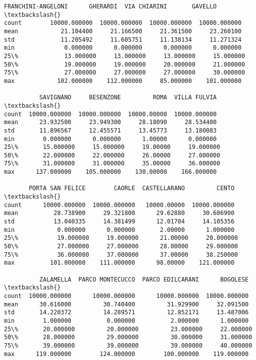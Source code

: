 \documentclass[11pt]{article}
\begin{document}
\begin{tcolorbox}[breakable, size=fbox, boxrule=.5pt, pad at break*=1mm, opacityfill=0]
\begin{Verbatim}[commandchars=\\\{\}]
       FRANCHINI-ANGELONI      GHERARDI  VIA CHIARINI       GAVELLO  \textbackslash{}
count        10000.000000  10000.000000  10000.000000  10000.000000
mean            21.104400     21.166500     21.361500     23.260100
std             11.205492     11.605751     11.138134     11.271324
min              0.000000      0.000000      0.000000      0.000000
25\%             13.000000     13.000000     13.000000     15.000000
50\%             19.000000     19.000000     20.000000     21.000000
75\%             27.000000     27.000000     27.000000     30.000000
max            102.000000    112.000000     85.000000    101.000000

          SAVIGNANO     BESENZONE         ROMA  VILLA FULVIA  \textbackslash{}
count  10000.000000  10000.000000  10000.00000  10000.000000
mean      23.932500     23.949300     28.18090     28.534400
std       11.896567     12.455571     13.45773     13.180083
min        0.000000      0.000000      1.00000      0.000000
25\%       15.000000     15.000000     19.00000     19.000000
50\%       22.000000     22.000000     26.00000     27.000000
75\%       31.000000     31.000000     35.00000     36.000000
max      137.000000    105.000000    130.00000    166.000000

       PORTA SAN FELICE        CAORLE  CASTELLARANO         CENTO  \textbackslash{}
count      10000.000000  10000.000000   10000.00000  10000.000000
mean          28.738900     29.321800      29.62880     30.606900
std           13.040335     14.381499      12.01704     14.105356
min            0.000000      0.000000       2.00000      1.000000
25\%           19.000000     19.000000      21.00000     20.000000
50\%           27.000000     27.000000      28.00000     29.000000
75\%           36.000000     37.000000      37.00000     38.250000
max          101.000000    111.000000      98.00000    121.000000

          ZALAMELLA  PARCO MONTECUCCO  PARCO EDILCARANI      BOGOLESE  \textbackslash{}
count  10000.000000      10000.000000      10000.000000  10000.000000
mean      30.616000         30.740400         31.929900     32.091500
std       14.220372         14.289571         12.852171     13.487006
min        1.000000          0.000000          2.000000      1.000000
25\%       20.000000         20.000000         23.000000     22.000000
50\%       28.000000         29.000000         30.000000     31.000000
75\%       39.000000         39.000000         39.000000     40.000000
max      119.000000        124.000000        100.000000    119.000000


\end{Verbatim}
\end{tcolorbox}
\end{document}
